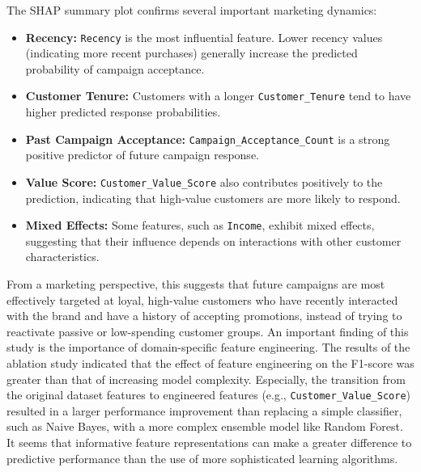 \documentclass[conference]{IEEEtran}
\begin{document}
The SHAP summary plot confirms several important marketing dynamics:
\begin{itemize}

    \item \textbf{Recency:} \texttt{Recency} is the most influential feature. Lower recency values (indicating more recent purchases) generally increase the predicted probability of campaign acceptance.

    \item \textbf{Customer Tenure:} Customers with a longer \texttt{Customer\_Tenure} tend to have higher predicted response probabilities.

    \item \textbf{Past Campaign Acceptance:} \texttt{Campaign\_Acceptance\_Count} is a strong positive predictor of future campaign response.

    \item \textbf{Value Score:} \texttt{Customer\_Value\_Score} also contributes positively to the prediction, indicating that high-value customers are more likely to respond.

    \item \textbf{Mixed Effects:} Some features, such as \texttt{Income}, exhibit mixed effects, suggesting that their influence depends on interactions with other customer characteristics.

\end{itemize}

From a marketing perspective, this suggests that future campaigns are most effectively targeted at loyal, high-value customers who have recently interacted with the brand and have a history of accepting promotions, instead of trying to reactivate passive or low-spending customer groups.
An important finding of this study is the importance of domain-specific feature engineering. 
The results of the ablation study indicated that the effect of feature engineering on the F1-score was greater than that of increasing model complexity. 
Especially, the transition from the original dataset features to engineered features (e.g., \texttt{Customer\_Value\_Score}) resulted in a larger performance improvement than replacing a simple classifier, such as Naive Bayes, with a more complex ensemble model like Random Forest. 
It seems that informative feature representations can make a greater difference to predictive performance than the use of more sophisticated learning algorithms.
\end{document}
